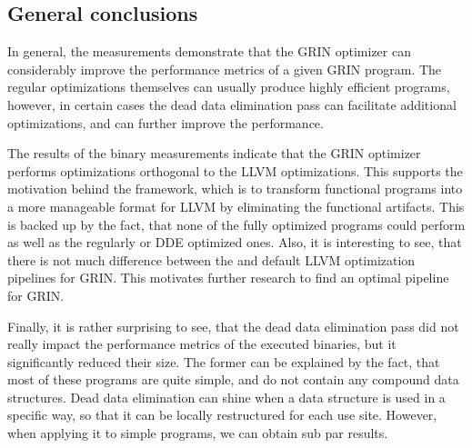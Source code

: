 \documentclass[main.tex]{subfiles}
\begin{document}
	\subsection{General conclusions}
	
	In general, the measurements demonstrate that the GRIN optimizer can considerably improve the performance metrics of a given GRIN program. The regular optimizations themselves can usually produce highly efficient programs, however, in certain cases the dead data elimination pass can facilitate additional optimizations, and can further improve the performance.
	
	The results of the binary measurements indicate that the GRIN optimizer performs optimizations orthogonal to the LLVM optimizations. This supports the motivation behind the framework, which is to transform functional programs into a more manageable format for LLVM by eliminating the functional artifacts. This is backed up by the fact, that none of the fully optimized  programs could perform as well as the regularly or DDE optimized ones. Also, it is interesting to see, that there is not much difference between the  and  default LLVM optimization pipelines for GRIN. This motivates further research to find an optimal pipeline for GRIN. 
	
	Finally, it is rather surprising to see, that the dead data elimination pass did not really impact the performance metrics of the executed binaries, but it significantly reduced their size. The former can be explained by the fact, that most of these programs are quite simple, and do not contain any compound data structures. Dead data elimination can shine when a data structure is used in a specific way, so that it can be locally restructured for each use site. However, when applying it to simple programs, we can obtain sub par results.
\end{document}
